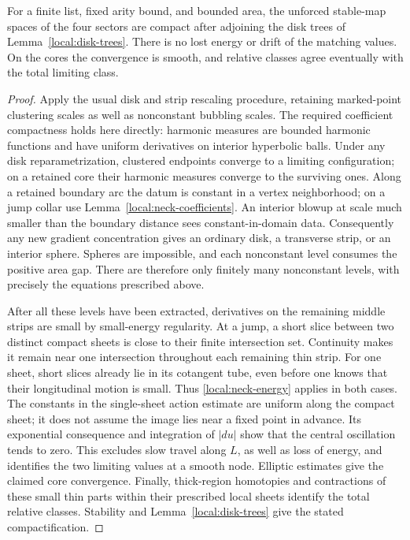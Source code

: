 \begin{lemma}\label{local:compactness}
For a finite list, fixed arity bound, and bounded area, the unforced
stable-map spaces of the four sectors are compact after adjoining the
disk trees of Lemma~\ref{local:disk-trees}.  There is no lost energy or
drift of the matching values.  On the cores the convergence is smooth,
and relative classes agree eventually with the total limiting class.
\end{lemma}
\begin{proof}
Apply the usual disk and strip rescaling procedure, retaining marked-point clustering scales as well as nonconstant bubbling scales.  The
required coefficient compactness holds here directly: harmonic
measures are bounded harmonic functions and have uniform derivatives
on interior hyperbolic balls.  Under any disk reparametrization,
clustered endpoints converge to a limiting configuration; on a
retained core their harmonic measures converge to the surviving ones.
Along a retained boundary arc the datum is constant in a vertex
neighborhood; on a jump collar use
Lemma~\ref{local:neck-coefficients}.  An interior blowup at scale much
smaller than the boundary distance sees constant-in-domain data.
Consequently any new gradient concentration gives an ordinary disk,
a transverse strip, or an interior sphere.  Spheres are impossible,
and each nonconstant level consumes the positive area gap.  There
are therefore only finitely many nonconstant levels, with precisely
the equations prescribed above.

After all these levels have been extracted, derivatives on the
remaining middle strips are small by small-energy regularity.  At
a jump, a short slice between two distinct compact sheets is close
to their finite intersection set.  Continuity makes it remain near
one intersection throughout each remaining thin strip.  For one
sheet, short slices already lie in its cotangent tube, even before
one knows that their longitudinal motion is small.  Thus
\eqref{local:neck-energy} applies in both cases.  The constants in the
single-sheet action estimate are uniform along the compact sheet;
it does not assume the image lies near a fixed point in advance.
Its exponential consequence and integration of $|du|$ show that the
central oscillation tends to zero.  This excludes slow travel along
$L$, as well as loss of energy, and identifies the two limiting values
at a smooth node.  Elliptic estimates give the claimed core
convergence.  Finally, thick-region homotopies and contractions of
these small thin parts within their prescribed local sheets identify
the total relative classes.  Stability and
Lemma~\ref{local:disk-trees} give the stated compactification.
\end{proof}

